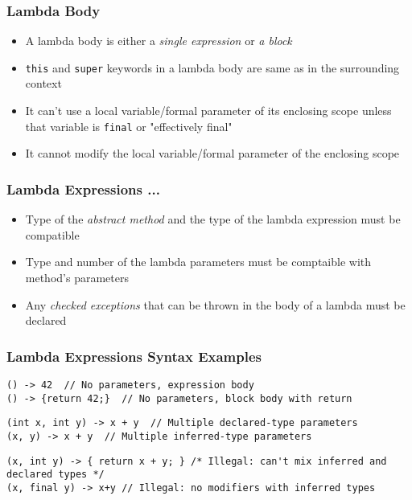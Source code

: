 \documentclass{beamer}
\begin{document}
\begin{frame}[fragile]
    \frametitle{Lambda Body}
\begin{itemize} 
\item <1-> A lambda body is either a \textit{single expression} or \textit{a block}
\item <2-> \texttt{this} and \texttt{super} keywords in a lambda body are same as in the surrounding context
\item <3-> It can't use a local variable/formal parameter of its enclosing scope unless 
that variable is \texttt{final} or "effectively final"
\item <4-> It cannot modify the local variable/formal parameter of the enclosing scope
\end{itemize}
\end{frame}


\begin{frame}[fragile]
    \frametitle{Lambda Expressions ...}
\begin{itemize}
   \item <1-> Type of the \textit{abstract method} and the type of the lambda expression must be compatible
   \item <2-> Type and number of the lambda parameters must be comptaible with method's parameters
   \item <3-> Any \textit{checked exceptions} that can be thrown in the body of a lambda must be declared
\end{itemize}
\end{frame}


\begin{frame}[fragile]
    \frametitle{Lambda Expressions Syntax Examples }

\begin{lstlisting}
() -> 42  // No parameters, expression body
() -> {return 42;}  // No parameters, block body with return
\end{lstlisting}
\pause

\begin{lstlisting}
(int x, int y) -> x + y  // Multiple declared-type parameters
(x, y) -> x + y  // Multiple inferred-type parameters
\end{lstlisting}
\pause

\begin{lstlisting}
(x, int y) -> { return x + y; } /* Illegal: can't mix inferred and declared types */
(x, final y) -> x+y // Illegal: no modifiers with inferred types
\end{lstlisting}

\end{frame}
\end{document}
